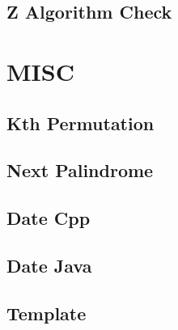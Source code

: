 \subsection{Z Algorithm Check}
\raggedbottom
\hrulefill

\section{MISC}
\subsection{Kth Permutation}
\raggedbottom
\hrulefill
\subsection{Next Palindrome}
\raggedbottom
\hrulefill
\subsection{Date Cpp}
\raggedbottom
\hrulefill
\subsection{Date Java}
\raggedbottom
\hrulefill
\subsection{Template}
\raggedbottom
\hrulefill

